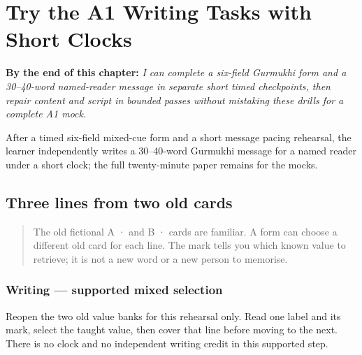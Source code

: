 
\chapter{Try the A1 Writing Tasks with Short Clocks}
\label{ch:pa-a1-writing-short-clocks}

\begin{chapteropening}
\textbf{By the end of this chapter:} \emph{I can complete a six-field Gurmukhi form and a 30–40-word named-reader message in separate short timed checkpoints, then repair content and script in bounded passes without mistaking these drills for a complete A1 mock.}

After a timed six-field mixed-cue form and a short message pacing rehearsal, the learner independently writes a 30–40-word Gurmukhi message for a named reader under a short clock; the full twenty-minute paper remains for the mocks.
\end{chapteropening}

\section[\texorpdfstring{\pa{ਨਾਂ}: · \pa{ਭਾਸ਼ਾ} … (mixed familiar …)}{ਨਾਂ: · ਭਾਸ਼ਾ … (mixed familiar …)}]{Three lines from two old cards}

\label{lesson:PA-W13-form-mixed-cues}



\begin{quote}
The old fictional A ·  and B ·  cards are familiar. A form can choose a different old card for each line. The mark tells you which known value to retrieve; it is not a new word or a new person to memorise.
\end{quote}

\subsection*{Writing — supported mixed selection}
Reopen the two old value banks for this rehearsal only. Read one label and its mark, select the taught value, then cover that line before moving to the next. There is no clock and no independent writing credit in this supported step.

